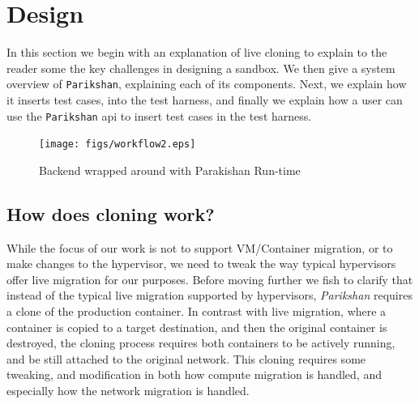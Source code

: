 
\section{Design}
\label{sec:design}

In this section we begin with an explanation of live cloning to explain to the reader some the key challenges in designing a sandbox. We then give a system overview of \texttt{Parikshan}, explaining each of its components. 
Next, we explain how it inserts test cases, into the test harness, and finally we explain how a user can use the \texttt{Parikshan} api to insert test cases in the test harness.

\begin{figure}[t]
  \begin{center}
    \texttt{[image: figs/workflow2.eps]}
    \caption{Backend wrapped around with Parakishan Run-time}
    \label{fig:workflow}
  \end{center}
\end{figure}

\subsection{How does cloning work?}

While the focus of our work is not to support VM/Container migration, or to make changes to the hypervisor, we need to tweak the way typical hypervisors offer live migration for our purposes.
Before moving further we fish to clarify that instead of the typical live migration supported by hypervisors, \textit{Parikshan} requires a clone of the production container. 
In contrast with live migration, where a container is copied to a target destination, and then the original container is destroyed, the cloning process requires both containers to be actively running, and be still attached to the original network.
This cloning requires some tweaking, and modification in both how compute migration is handled, and especially how the network migration is handled. 

